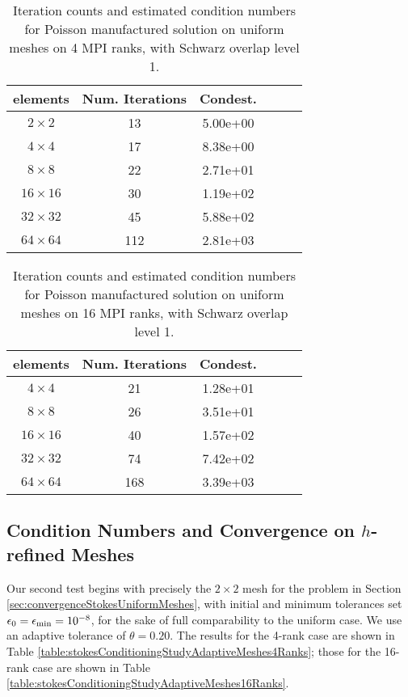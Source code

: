 \documentclass[11pt]{amsart}
\begin{document}
\begin{table}
\begin{tabular}{ c  c  c  c  c  c }
elements	&Num. Iterations	&Condest.		\\
\hline
$2 \times 2$		&13	&5.00e+00\\
$4 \times 4$		&17	&8.38e+00\\
$8 \times 8$		&22	&2.71e+01\\
$16 \times 16$		&30	&1.19e+02\\
$32 \times 32$		&45	&5.88e+02\\
$64 \times 64$		&112	& 2.81e+03\\
\end{tabular}
\caption{Iteration counts and estimated condition numbers for Poisson manufactured solution on uniform meshes on 4 MPI ranks, with Schwarz overlap level 1.}
\label{table:poissonConditioningStudyUniformMesh4RanksOverlap1}
\end{table}

\begin{table}
\begin{tabular}{ c  c  c  c  c  c }
elements	&Num. Iterations	&Condest.		\\
\hline
$4 \times 4$		&21		&1.28e+01\\
$8 \times 8$		&26		&3.51e+01\\
$16 \times 16$ 		&40		&1.57e+02\\
$32 \times 32$		&74		&7.42e+02\\
$64 \times 64$		&168 	&3.39e+03\\
\end{tabular}
\caption{Iteration counts and estimated condition numbers for Poisson manufactured solution on uniform meshes on 16 MPI ranks, with Schwarz overlap level 1.}
\label{table:poissonConditioningStudyUniformMesh16RanksOverlap1}
\end{table}

\subsection{Condition Numbers and Convergence on $h$-refined Meshes}
Our second test begins with precisely the $2 \times 2$ mesh for the problem in Section \ref{sec:convergenceStokesUniformMeshes}, with initial and minimum tolerances set $\epsilon_0 = \epsilon_{\rm min} = 10^{-8}$, for the sake of full comparability to the uniform case.  We use an adaptive tolerance of $\theta=0.20$.  The results for the 4-rank case are shown in Table \ref{table:stokesConditioningStudyAdaptiveMeshes4Ranks}; those for the 16-rank case are shown in Table \ref{table:stokesConditioningStudyAdaptiveMeshes16Ranks}.
\end{document}
